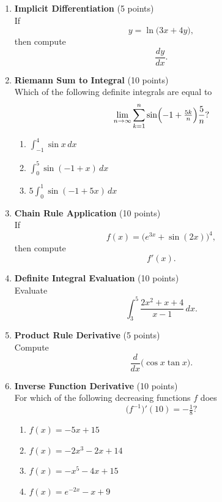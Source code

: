 \begin{enumerate}
  \item \textbf{Implicit Differentiation} (5 points)\\
  If
  \[
    y = \ln\bigl(3x + 4y\bigr),
  \]
  then compute
  \[
    \frac{dy}{dx}.
  \]
  \begin{subanswer}
  \end{subanswer}

  \item \textbf{Riemann Sum to Integral} (10 points)\\
  Which of the following definite integrals are equal to
  \[
    \lim_{n \to \infty} \sum_{k=1}^n \sin\Bigl(-1 + \tfrac{5k}{n}\Bigr) \frac{5}{n}?
  \]
  \begin{enumerate}[label=(\Roman*)]
    \item $\displaystyle \int_{-1}^{4} \sin x \,dx$
    \item $\displaystyle \int_{0}^{5} \sin(-1+x) \,dx$
    \item $\displaystyle 5 \int_{0}^{1} \sin(-1 + 5x) \,dx$
  \end{enumerate}
  \begin{subanswer}
  \end{subanswer}

  \item \textbf{Chain Rule Application} (10 points)\\
  If
  \[
    f(x) = \bigl(e^{3x} + \sin(2x)\bigr)^4,
  \]
  then compute
  \[
    f'(x).
  \]
  \begin{subanswer}
  \end{subanswer}

  \item \textbf{Definite Integral Evaluation} (10 points)\\
  Evaluate
  \[
    \int_{3}^{5} \frac{2x^2 + x + 4}{x - 1} \,dx.
  \]
  \begin{subanswer}
  \end{subanswer}

  \item \textbf{Product Rule Derivative} (5 points)\\
  Compute
  \[
    \frac{d}{dx}\bigl(\cos x \tan x\bigr).
  \]
  \begin{subanswer}
  \end{subanswer}

  \item \textbf{Inverse Function Derivative} (10 points)\\
  For which of the following decreasing functions $f$ does
  \[
    \bigl(f^{-1}\bigr)'(10) = -\tfrac{1}{8}?
  \]
  \begin{enumerate}[label=(\Alph*)]
    \item $f(x) = -5x + 15$
    \item $f(x) = -2x^3 - 2x + 14$
    \item $f(x) = -x^5 - 4x + 15$
    \item $f(x) = e^{-2x} - x + 9$
  \end{enumerate}
  \begin{subanswer}
  \end{subanswer}


\end{enumerate}
